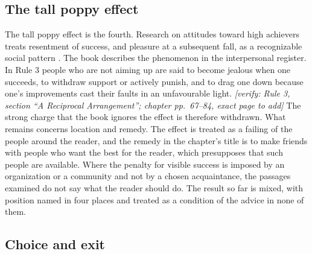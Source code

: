 \documentclass[12pt]{article}
\newif\ifverify\verifytrue
\newcommand{\passage}[1]{\ifverify{\footnotesize\color{gray}\textit{[verify: #1]}}\fi}
\begin{document}
\subsection*{The tall poppy effect}

The tall poppy effect is the fourth. Research on attitudes toward high achievers treats resentment of success, and pleasure at a subsequent fall, as a recognizable social pattern \cite{feather1989,feather2002}. The book describes the phenomenon in the interpersonal register. In Rule 3 people who are not aiming up are said to become jealous when one succeeds, to withdraw support or actively punish, and to drag one down because one's improvements cast their faults in an unfavourable light. \passage{Rule 3, section ``A Reciprocal Arrangement''; chapter pp.~67--84, exact page to add} The strong charge that the book ignores the effect is therefore withdrawn. What remains concerns location and remedy. The effect is treated as a failing of the people around the reader, and the remedy in the chapter's title is to make friends with people who want the best for the reader, which presupposes that such people are available. Where the penalty for visible success is imposed by an organization or a community and not by a chosen acquaintance, the passages examined do not say what the reader should do. The result so far is mixed, with position named in four places and treated as a condition of the advice in none of them.

\subsection*{Choice and exit}
\end{document}
